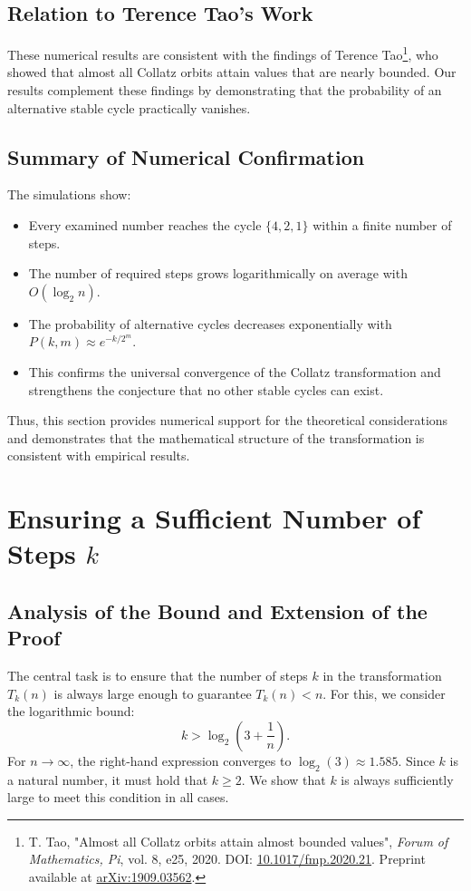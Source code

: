 \documentclass[a4paper,12pt]{article}
\begin{document}
\subsection{Relation to Terence Tao's Work}
These numerical results are consistent with the findings of Terence Tao\footnote{T. Tao, "Almost all Collatz orbits attain almost bounded values", \textit{Forum of Mathematics, Pi}, vol. 8, e25, 2020. DOI: \href{https://doi.org/10.1017/fmp.2020.21}{10.1017/fmp.2020.21}. Preprint available at \href{https://arxiv.org/abs/1909.03562}{arXiv:1909.03562}.}, who showed that almost all Collatz orbits attain values that are nearly bounded. Our results complement these findings by demonstrating that the probability of an alternative stable cycle practically vanishes.

\subsection{Summary of Numerical Confirmation}
The simulations show:
\begin{itemize}
    \item Every examined number reaches the cycle \( \{4,2,1\} \) within a finite number of steps.
    \item The number of required steps grows logarithmically on average with \( O(\log_2 n) \).
    \item The probability of alternative cycles decreases exponentially with \( P(k, m) \approx e^{-k/2^m} \).
    \item This confirms the universal convergence of the Collatz transformation and strengthens the conjecture that no other stable cycles can exist.
\end{itemize}

Thus, this section provides numerical support for the theoretical considerations and demonstrates that the mathematical structure of the transformation is consistent with empirical results.

\section{Ensuring a Sufficient Number of Steps \( k \)}

\subsection{Analysis of the Bound and Extension of the Proof}
The central task is to ensure that the number of steps \( k \) in the transformation \( T_k(n) \) is always large enough to guarantee \( T_k(n) < n \). For this, we consider the logarithmic bound:
\[
k > \log_2\left(3 + \frac{1}{n}\right).
\]
For \( n \to \infty \), the right-hand expression converges to \( \log_2(3) \approx 1.585 \). Since \( k \) is a natural number, it must hold that \( k \geq 2 \). We show that \( k \) is always sufficiently large to meet this condition in all cases.
\end{document}

